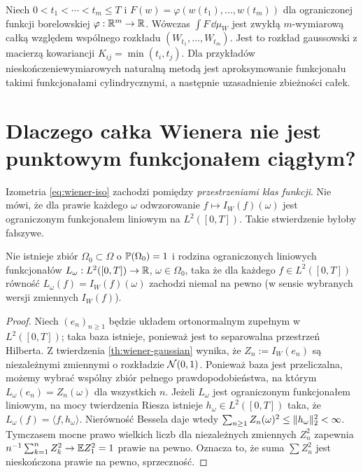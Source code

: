 \begin{przyklad}
Niech $0<t_1<\cdots<t_m\le T$ i
$F(w)=\varphi(w(t_1),\ldots,w(t_m))$ dla ograniczonej
funkcji borelowskiej $\varphi:\mathbb{R}^m\to\mathbb{R}$.
Wówczas $\int F\,\dd\mu_W$ jest zwykłą
$m$-wymiarową całką względem wspólnego rozkładu
$(W_{t_1},\ldots,W_{t_m})$. Jest to rozkład gaussowski
z macierzą kowariancji $K_{ij}=\min(t_i,t_j)$.
Dla przykładów nieskończeniewymiarowych naturalną metodą
jest aproksymowanie funkcjonału takimi funkcjonałami
cylindrycznymi, a następnie uzasadnienie zbieżności całek.
\end{przyklad}

\section{Dlaczego całka Wienera nie jest punktowym funkcjonałem ciągłym?}
Izometria \eqref{eq:wiener-iso} zachodzi pomiędzy
\emph{przestrzeniami klas funkcji}. Nie mówi, że dla prawie
każdego $\omega$ odwzorowanie
$f\mapsto I_W(f)(\omega)$ jest ograniczonym funkcjonałem
liniowym na $L^2([0,T])$. Takie stwierdzenie byłoby fałszywe.

\begin{twierdzenie}
Nie istnieje zbiór $\Omega_0\subset\Omega$ o
$\mathbb{P}(\Omega_0)=1$ i rodzina ograniczonych liniowych
funkcjonałów $L_\omega:L^2([0,T])\to\mathbb{R}$, $\omega\in\Omega_0$,
taka że dla każdego $f\in L^2([0,T])$ równość
$L_\omega(f)=I_W(f)(\omega)$ zachodzi niemal na pewno
(w sensie wybranych wersji zmiennych $I_W(f)$).
\end{twierdzenie}
\begin{proof}
Niech $(e_n)_{n\ge1}$ będzie układem ortonormalnym zupełnym
w $L^2([0,T])$; taka baza istnieje, ponieważ jest to
separowalna przestrzeń Hilberta. Z twierdzenia
\ref{th:wiener-gaussian} wynika, że
$Z_n:=I_W(e_n)$ są niezależnymi zmiennymi o rozkładzie
$\mathcal{N}(0,1)$. Ponieważ baza jest przeliczalna, możemy
wybrać wspólny zbiór pełnego prawdopodobieństwa, na którym
$L_\omega(e_n)=Z_n(\omega)$ dla wszystkich $n$.
Jeżeli $L_\omega$ jest ograniczonym funkcjonałem liniowym,
na mocy twierdzenia Riesza istnieje $h_\omega\in L^2([0,T])$
taka, że $L_\omega(f)=\langle f,h_\omega\rangle$.
Nierówność Bessela daje wtedy
$\sum_{n\ge1}Z_n(\omega)^2\le\lVert h_\omega\rVert_2^2<\infty$.
Tymczasem mocne prawo wielkich liczb dla niezależnych
zmiennych $Z_n^2$ zapewnia
$n^{-1}\sum_{k=1}^nZ_k^2\to\mathbb{E} Z_1^2=1$ prawie na pewno.
Oznacza to, że suma $\sum Z_n^2$ jest nieskończona
prawie na pewno, sprzeczność.
\end{proof}

